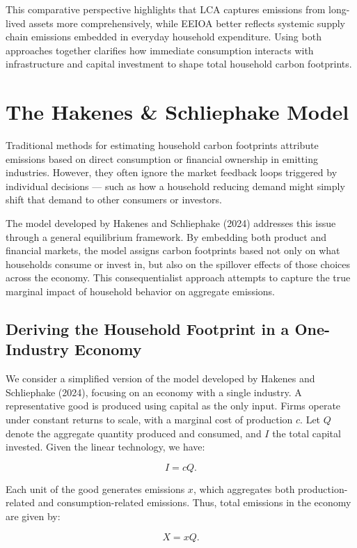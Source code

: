 \documentclass[12pt,a4paper]{article}%
\begin{document}
This comparative perspective highlights that LCA captures emissions from long-lived assets more comprehensively, while EEIOA better reflects systemic supply chain emissions embedded in everyday household expenditure. Using both approaches together clarifies how immediate consumption interacts with infrastructure and capital investment to shape total household carbon footprints.

\section{The Hakenes \& Schliephake Model}

Traditional methods for estimating household carbon footprints attribute emissions based on direct consumption or financial ownership in emitting industries. However, they often ignore the market feedback loops triggered by individual decisions — such as how a household reducing demand might simply shift that demand to other consumers or investors.

The model developed by Hakenes and Schliephake (2024) addresses this issue through a general equilibrium framework. By embedding both product and financial markets, the model assigns carbon footprints based not only on what households consume or invest in, but also on the spillover effects of those choices across the economy. This consequentialist approach attempts to capture the true marginal impact of household behavior on aggregate emissions.

\subsection{Deriving the Household Footprint in a One-Industry Economy}

We consider a simplified version of the model developed by Hakenes and Schliephake (2024), focusing on an economy with a single industry. A representative good is produced using capital as the only input. Firms operate under constant returns to scale, with a marginal cost of production $c$. Let $Q$ denote the aggregate quantity produced and consumed, and $I$ the total capital invested. Given the linear technology, we have:

\[
I = cQ.
\]

Each unit of the good generates emissions $x$, which aggregates both production-related and consumption-related emissions. Thus, total emissions in the economy are given by:

\[
X = xQ.
\]
\end{document}
